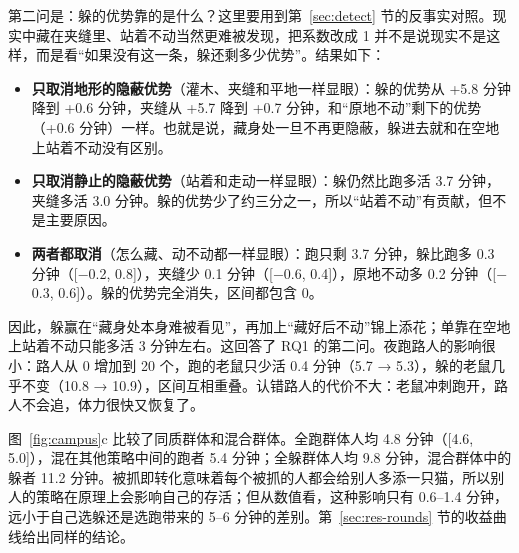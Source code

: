 第二问是：躲的优势靠的是什么？这里要用到第~\ref{sec:detect} 节的反事实对照。现实中藏在夹缝里、站着不动当然更难被发现，把系数改成 1 并不是说现实不是这样，而是看“如果没有这一条，躲还剩多少优势”。结果如下：

\begin{itemize}
  \item \textbf{只取消地形的隐蔽优势}（灌木、夹缝和平地一样显眼）：躲的优势从 +5.8 分钟降到 +0.6 分钟，夹缝从 +5.7 降到 +0.7 分钟，和“原地不动”剩下的优势（+0.6 分钟）一样。也就是说，藏身处一旦不再更隐蔽，躲进去就和在空地上站着不动没有区别。
  \item \textbf{只取消静止的隐蔽优势}（站着和走动一样显眼）：躲仍然比跑多活 3.7 分钟，夹缝多活 3.0 分钟。躲的优势少了约三分之一，所以“站着不动”有贡献，但不是主要原因。
  \item \textbf{两者都取消}（怎么藏、动不动都一样显眼）：跑只剩 3.7 分钟，躲比跑多 0.3 分钟（[$-$0.2, 0.8]），夹缝少 0.1 分钟（[$-$0.6, 0.4]），原地不动多 0.2 分钟（[$-$0.3, 0.6]）。躲的优势完全消失，区间都包含 0。
\end{itemize}

因此，躲赢在“藏身处本身难被看见”，再加上“藏好后不动”锦上添花；单靠在空地上站着不动只能多活 3 分钟左右。这回答了 RQ1 的第二问。夜跑路人的影响很小：路人从 0 增加到 20 个，跑的老鼠只少活 0.4 分钟（5.7 → 5.3），躲的老鼠几乎不变（10.8 → 10.9），区间互相重叠。认错路人的代价不大：老鼠冲刺跑开，路人不会追，体力很快又恢复了。

图~\ref{fig:campus}c 比较了同质群体和混合群体。全跑群体人均 4.8 分钟（[4.6, 5.0]），混在其他策略中间的跑者 5.4 分钟；全躲群体人均 9.8 分钟，混合群体中的躲者 11.2 分钟。被抓即转化意味着每个被抓的人都会给别人多添一只猫，所以别人的策略在原理上会影响自己的存活；但从数值看，这种影响只有 0.6–1.4 分钟，远小于自己选躲还是选跑带来的 5–6 分钟的差别。第~\ref{sec:res-rounds} 节的收益曲线给出同样的结论。
